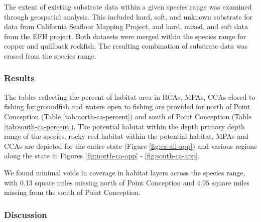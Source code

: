 \documentclass[11pt,
  english,
  a4paper,
]{article}
\begin{document}
The extent of existing substrate data within a given species range was examined through geospatial analysis. This included hard, soft, and unknown substrate for data from California Seafloor Mapping Project, and hard, mixed, and soft data from the EFH project. Both datasets were merged within the species range for copper and quillback rockfish. The resulting combination of substrate data was erased from the species range.

\leavevmode\tagmcend\tagstructend\par


\hypertarget{results}{%
\subsubsection{Results}\label{results}}

\leavevmode\tagmcend\tagstructend


The tables reflecting the percent of habitat area in RCAs, MPAs, CCAs closed to fishing for groundfish and waters open to fishing are provided for north of Point Conception (Table \ref{tab:north-ca-percent}) and south of Point Conception (Table \ref{tab:south-ca-percent}). The potential habitat within the depth primary depth range of the species, rocky reef habitat within the potential habitat, MPAs and CCAs are depicted for the entire state (Figure \ref{fig:ca-all-app}) and various regions along the state in Figures \ref{fig:north-ca-app} - \ref{fig:south-ca-app}.

\leavevmode\tagmcend\tagstructend\par


We found minimal voids in coverage in habitat layers across the species range, with 0.13 square miles missing north of Point Conception and 4.95 square miles missing from the south of Point Conception.

\leavevmode\tagmcend\tagstructend\par


\hypertarget{discussion}{%
\subsubsection{Discussion}\label{discussion}}
\end{document}
